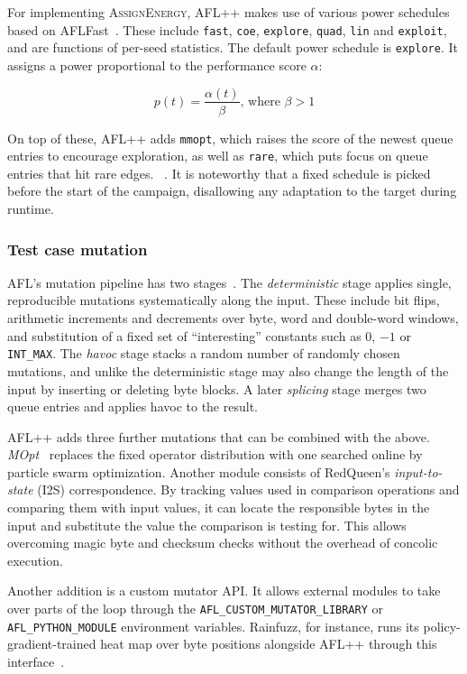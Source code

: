 For implementing \textsc{AssignEnergy}, AFL++ makes use of various power schedules
based on AFLFast~\cite{bohme_coverage-based_2016}. These include \texttt{fast},
\texttt{coe}, \texttt{explore}, \texttt{quad}, \texttt{lin} and
\texttt{exploit}, and are functions of per-seed statistics.
The default power schedule is \texttt{explore}.
It assigns a power proportional to the performance score $\alpha$:

\[
  p(t)=\frac{\alpha(t)}{\beta}\text{, where }\beta > 1
\]

On top of these, AFL++ adds \texttt{mmopt}, which raises the score of the newest queue
entries to encourage exploration, as well as
\texttt{rare}, which puts focus on queue entries that hit rare edges.~\cite{fioraldi_afl_nodate}
.
It is noteworthy that a fixed schedule is picked before the start of the campaign, disallowing any adaptation to the target during runtime.

\subsubsection{Test case mutation}

AFL's mutation pipeline has two stages~\cite{fioraldi_afl_nodate}.
The \emph{deterministic} stage applies single, reproducible mutations systematically along
the input.
These include bit flips, arithmetic increments and decrements over byte, word and
double-word windows, and substitution of a fixed set of \enquote{interesting} constants
such as $0$, $-1$ or \texttt{INT\_MAX}.
The \emph{havoc} stage stacks a random number of randomly chosen mutations, and unlike the
deterministic stage may also change the length of the input by inserting or deleting
byte blocks.
A later \emph{splicing} stage merges two queue entries and applies havoc to the result.

AFL++ adds three further mutations that can be combined with the above.
\emph{MOpt}~\cite{lyu_mopt_nodate} replaces the fixed operator distribution with one
searched online by particle swarm optimization.
Another module consists of RedQueen's \emph{input-to-state} (I2S)
correspondence.
By tracking values used in comparison operations and comparing them with input values,
it can locate the responsible bytes in the input and substitute the value the comparison is testing for.
This allows overcoming magic byte and checksum checks without the overhead of concolic execution.

Another addition is a custom mutator API.
It allows external modules to take over parts of the loop through the \texttt{AFL\_CUSTOM\_MUTATOR\_LIBRARY} or \texttt{AFL\_PYTHON\_MODULE}
environment variables.
Rainfuzz, for instance, runs its policy-gradient-trained heat map over byte
positions alongside AFL++ through this interface~\cite{binosi_rainfuzz_2023}.

